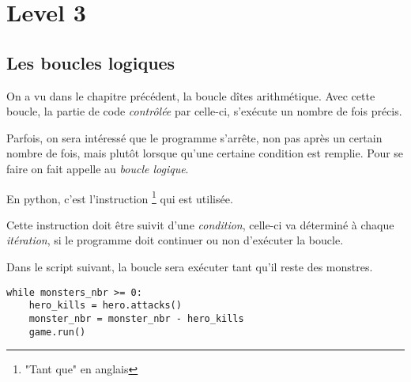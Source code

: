 




\chapter{Level 3}

\section{Les boucles logiques}

On a vu dans le chapitre précédent, la boucle dîtes arithmétique. Avec cette boucle, la partie de code \emph{contrôlée} par celle-ci, s'exécute un nombre de fois précis.

Parfois, on sera intéressé que le programme s'arrête, non pas après un certain nombre de fois, mais plutôt lorsque qu'une certaine condition est remplie. Pour se faire on fait appelle au \emph{boucle logique}.

En python, c'est l'instruction \footnote{"Tant que" en anglais} qui est utilisée.

Cette instruction doit être suivit d'une \emph{condition}, celle-ci va déterminé à chaque \emph{itération}, si le programme doit continuer ou non d'exécuter la boucle.

Dans le script suivant, la boucle sera exécuter tant qu'il reste des monstres.

\begin{lstlisting}
while monsters_nbr >= 0:
	hero_kills = hero.attacks()
	monster_nbr = monster_nbr - hero_kills
	game.run()
\end{lstlisting}

